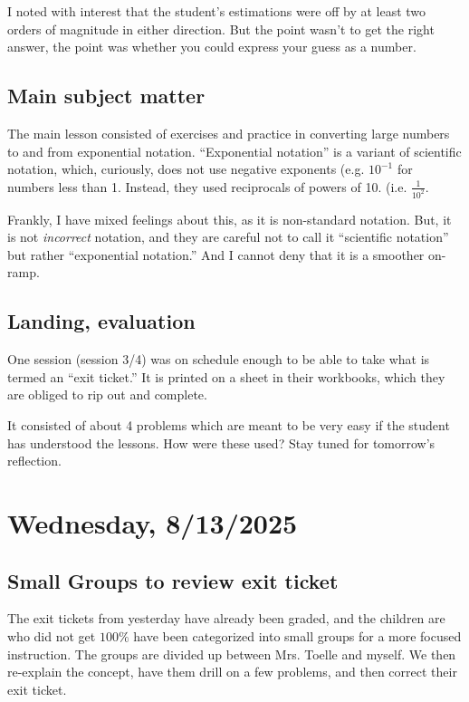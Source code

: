 \documentclass[11pt]{elegantbook}
\begin{document}
\noindent I noted with interest that the student's estimations were
off by at least two orders of magnitude in either direction.  But the
point wasn't to get the right answer, the point was whether you could
express your guess as a number.

\section*{Main subject matter}

The main lesson consisted of exercises and practice in converting
large numbers to and from exponential notation.  ``Exponential
notation'' is a variant of scientific notation, which, curiously, does
not use negative exponents (e.g. $10^{-1}$ for numbers less than 1.
Instead, they used reciprocals of powers of 10. (i.e. $\frac{1}{10^{2}}$.

Frankly, I have mixed feelings about this, as it is non-standard
notation.  But, it is not {\em incorrect} notation, and they are
careful not to call it ``scientific notation'' but rather
``exponential notation.'' And I cannot deny that it is a smoother
on-ramp.

\section*{Landing, evaluation}

One session (session 3/4) was on schedule enough to be able to take
what is termed an ``exit ticket.''  It is printed on a sheet in their
workbooks, which they are obliged to rip out and complete.

It consisted of about 4 problems which are meant to be very easy if
the student has understood the lessons.  How were these used? Stay
tuned for tomorrow's reflection.


\chapter{Wednesday, 8/13/2025}

\section*{Small Groups to review exit ticket}

The exit tickets from yesterday have already been graded, and the
children are who did not get $100\%$ have been categorized into small
groups for a more focused instruction.  The groups are divided up
between Mrs. Toelle and myself.  We then re-explain the concept, have
them drill on a few problems, and then correct their exit ticket.
\end{document}

